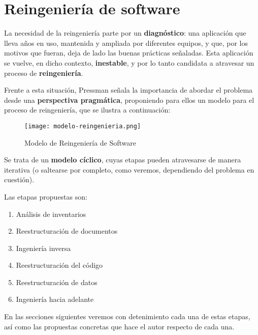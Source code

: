 \section{Reingeniería de software}

La necesidad de la reingeniería parte por un \textbf{diagnóstico}:
una aplicación que lleva años en uso,
mantenida y ampliada por diferentes equipos,
y que, por los motivos que fueran, 
deja de lado las buenas prácticas señaladas.
Esta aplicación se vuelve, en dicho contexto, \textbf{inestable},
y por lo tanto candidata a atravesar un proceso de \textbf{reingeniería}.

Frente a esta situación, Pressman señala la importancia de abordar 
el problema desde una \textbf{perspectiva pragmática},
proponiendo para ellos un modelo para el proceso de reingeniería,
que se ilustra a continuación:

\vspace{.5cm}
\begin{figure}[H]
    \centering
    \texttt{[image: modelo-reingenieria.png]}
    \caption{Modelo de Reingeniería de Software}
\end{figure}
\vspace{.5cm}

Se trata de un \textbf{modelo cíclico},
cuyas etapas pueden atravesarse de manera iterativa
(o saltearse por completo, como veremos, dependiendo del problema en cuestión).

Las etapas propuestas son:
\begin{enumerate}
    \item Análisis de inventarios
    \item Reestructuración de documentos
    \item Ingeniería inversa
    \item Reestructuración del código 
    \item Reestructuración de datos 
    \item Ingeniería hacia adelante
\end{enumerate}

En las secciones siguientes veremos con detenimiento cada una de estas etapas,
así como las propuestas concretas que hace el autor respecto de cada una.